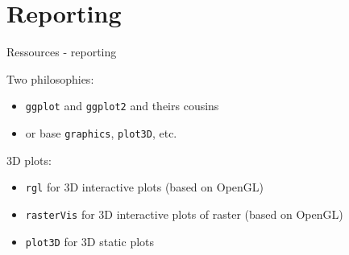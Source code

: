\documentclass[8pt,ignorenonframetext,]{beamer}
\providecommand{\tightlist}{%
  \setlength{\itemsep}{0pt}\setlength{\parskip}{0pt}}
\newcommand{\columnsend}{\end{columns}}
\begin{document}

\section{Reporting}\label{reporting}

\begin{frame}[fragile]{Ressources - reporting}

Two philosophies:

\begin{itemize}
\tightlist
\item
  \texttt{ggplot} and \texttt{ggplot2} and theirs cousins
\item
  or base \texttt{graphics}, \texttt{plot3D}, etc.
\end{itemize}

3D plots:

\begin{itemize}
\tightlist
\item
  \texttt{rgl} for 3D interactive plots (based on OpenGL)
\item
  \texttt{rasterVis} for 3D interactive plots of raster (based on
  OpenGL)
\item
  \texttt{plot3D} for 3D static plots
\end{itemize}

\end{frame}
\end{document}
